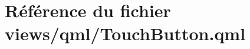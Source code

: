 \hypertarget{TouchButton_8qml}{\section{Référence du fichier views/qml/\-Touch\-Button.qml}
\label{TouchButton_8qml}
}
